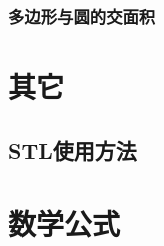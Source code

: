 \documentclass[openany, a4paper, 10pt]{book}
\begin{document}
\begin{spacing}{1.1}
			\subsection{多边形与圆的交面积}
				
	\chapter{其它}
		\section{STL使用方法}
			
	\chapter{数学公式}
		
	\end{spacing}
\end{document}

